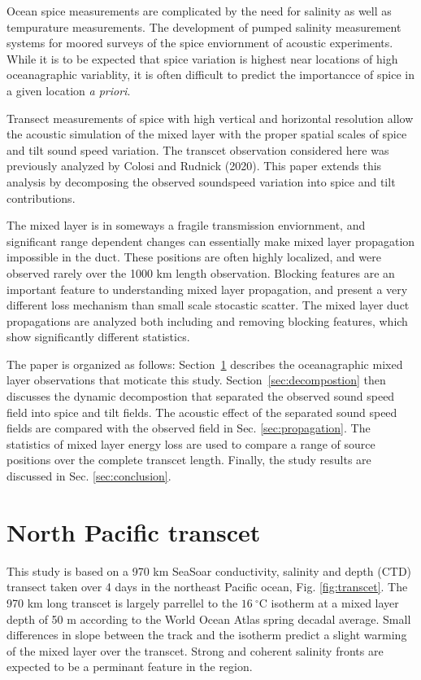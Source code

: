 \documentclass[preprint,NumberedRefs]{JASA}
\begin{document}
Ocean spice measurements are complicated by the need for salinity as well as tempurature measurements. The development of pumped salinity measurement systems for moored surveys of the spice enviornment of acoustic experiments. While it is to be expected that spice variation is highest near locations of high oceanagraphic variablity, it is often difficult to predict the importancce of spice in a given location \emph{a priori}.

Transect measurements of spice with high vertical and horizontal resolution allow the acoustic simulation of the mixed layer with the proper spatial scales of spice and tilt sound speed variation. The transcet observation considered here was previously analyzed by Colosi and Rudnick (2020)\citep{colosi2020observations}. This paper extends this analysis by decomposing the observed soundspeed variation into spice and tilt contributions.

The mixed layer is in someways a fragile transmission enviornment, and significant range dependent changes can essentially make mixed layer propagation impossible in the duct. These positions are often highly localized, and were observed rarely over the 1000 km length observation. Blocking features are an important feature to understanding mixed layer propagation, and present a very different loss mechanism than small scale stocastic scatter. The mixed layer duct propagations are analyzed both including and removing blocking features, which show significantly different statistics.

The paper is organized as follows: Section~\ref{sec:transcet} describes the oceanagraphic mixed layer observations that moticate this study. Section~\ref{sec:decompostion} then discusses the dynamic decompostion that separated the observed sound speed field into spice and tilt fields. The acoustic effect of the separated sound speed fields are compared with the observed field in Sec. \ref{sec:propagation}. The statistics of mixed layer energy loss are used to compare a range of source positions over the complete transcet length. Finally, the study results are discussed in Sec. \ref{sec:conclusion}.

\section{North Pacific transcet}\label{sec:transcet}
This study is based on a 970 km SeaSoar conductivity, salinity and depth (CTD) transect taken over 4 days in the northeast Pacific ocean\citep{cole2010seasonal}, Fig. \ref{fig:transcet}. The 970 km long transcet is largely parrellel to the $16 \ ^\circ$C isotherm at a mixed layer depth of 50 m according to the World Ocean Atlas spring decadal average. Small differences in slope between the track and the isotherm predict a slight warming of the mixed layer over the transcet. Strong and coherent salinity fronts are expected to be a perminant feature in the region.
\end{document}
